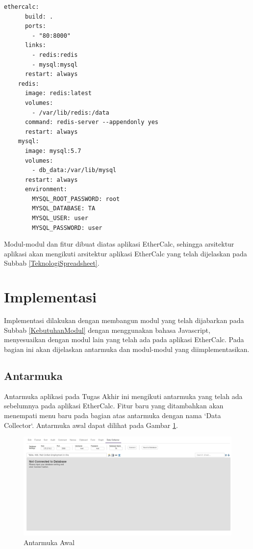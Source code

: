 	\begin{lstlisting}[frame=single, basicstyle=\linespread{1}\scriptsize\listingsfont, captionpos=b, caption={Kode pada docker-compose.yml}, label=KodeCompose]
	ethercalc:
	  build: .
	  ports:
	    - "80:8000"
	  links:
	    - redis:redis
	    - mysql:mysql
	  restart: always
	redis:
	  image: redis:latest
	  volumes:
	    - /var/lib/redis:/data
	  command: redis-server --appendonly yes
	  restart: always
	mysql:
	  image: mysql:5.7
	  volumes:
	    - db_data:/var/lib/mysql
	  restart: always
	  environment:
	    MYSQL_ROOT_PASSWORD: root
	    MYSQL_DATABASE: TA
	    MYSQL_USER: user
	    MYSQL_PASSWORD: user
	\end{lstlisting}

	Modul-modul dan fitur dibuat diatas aplikasi EtherCalc, sehingga arsitektur aplikasi akan mengikuti arsitektur aplikasi EtherCalc yang telah dijelaskan pada Subbab \ref{TeknologiSpreadsheet}.

\section{Implementasi}
Implementasi dilakukan dengan membangun modul yang telah dijabarkan pada Subbab \ref{KebutuhanModul} dengan menggunakan bahasa Javascript, menyesuaikan dengan modul lain yang telah ada pada aplikasi EtherCalc. Pada bagian ini akan dijelaskan antarmuka dan modul-modul yang diimplementasikan.
	\subsection{Antarmuka}
	Antarmuka aplikasi pada Tugas Akhir ini mengikuti antarmuka yang telah ada sebelumnya pada aplikasi EtherCalc. Fitur baru yang ditambahkan akan menempati menu baru pada bagian atas antarmuka dengan nama `Data Collector`. Antarmuka awal dapat dilihat pada Gambar \ref{Antarmuka1}.

	\begin{figure}[htb]
	    \centering
	    \includegraphics[width=1.0\textwidth]{resources/chapter-4-interface-1.png}
	    \caption{Antarmuka Awal}
		\label{Antarmuka1}
	\end{figure}

